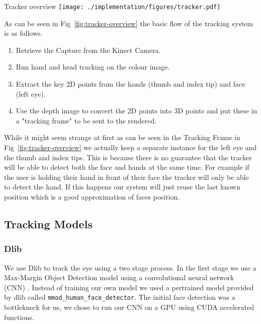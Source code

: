 \begin{figureBox}[label={fig:tracker-overview}, width=1.0\linewidth]{Tracker overview}
    \texttt{[image: ./implementation/figures/tracker.pdf]}
\end{figureBox}

As can be seen in Fig~\ref{fig:tracker-overview} the basic flow of the tracking system is as follows.
\begin{enumerate}[itemsep=-0.25em]
	\item Retrieve the Capture from the Kinect Camera.
	\item Run hand and head tracking on the colour image.
	\item Extract the key 2D points from the hands (thumb and index tip) and face (left eye).
	\item Use the depth image to convert the 2D points into 3D points and put these in a "tracking frame" to be sent to the rendered.
\end{enumerate}

While it might seem strange at first as can be seen in the Tracking Frame in Fig~\ref{fig:tracker-overview} we actually keep a separate instance for the left eye and the thumb and index tips. This is because there is no guarantee that the tracker will be able to detect both the face and hands at the same time. For example if the user is holding their hand in front of their face the tracker will only be able to detect the hand. If this happens our system will just reuse the last known position which is a good approximation of faces position. 

\subsection{Tracking Models}
\subsubsection{Dlib}

We use Dlib to track the eye using a two stage process. In the first stage we use a Max-Margin Object Detection model \tocite \tocite  using a convolutional neural network (CNN) \tocite. Instead of training our own model we used a pertrained model provided by dlib \tocite called \texttt{mmod\_human\_face\_detector}. The initial face detection was a bottlekneck for us, we chose to run our CNN on a GPU using CUDA accelerated functions. \\
 
